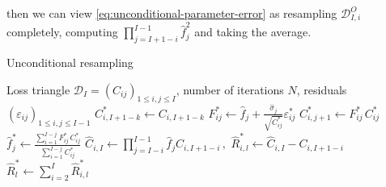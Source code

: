 \documentclass[a4paper]{book}
\theoremstyle{plain}
\begin{document}
then we can view \eqref{eq:unconditional-parameter-error} as resampling $\mathcal{D}^O_{I, i}$ completely, computing $\prod_{j=I+1-i}^{I-1}\hat{f}^2_j$ and taking the average. 

\begin{algorithm}
    \caption{Unconditional resampling} \label{alg:unconditional-resampling}
    \begin{algorithmic}
        \Require Loss triangle $\mathcal{D}_I = (C_{ij})_{1 \leq i, j \leq I}$, number of iterations $N$, residuals $(\varepsilon_{ij})_{1 \leq i, j \leq I - 1}$
        \vspace{2pt}
        \vspace{2pt}
                    \vspace{2pt}
                    \State $C^*_{i, I + 1 - k} \gets C_{i, I + 1 - k}$
                    \vspace{2pt}
                \EndFor
                        \vspace{4pt}
                        \State $\displaystyle F^*_{ij} \gets \hat{f}_j + \frac{\hat{\sigma}_j}{\sqrt{C^*_{ij}}} \varepsilon^*_{ij}$
                        \vspace{4pt}
                        \State $C^*_{i, j + 1} \gets F^*_{ij} \, C^*_{ij}$
                        \vspace{4pt}
                    \EndFor
                    \vspace{4pt}
                        \State $\displaystyle \hat{f}^*_j \gets \frac{\sum_{i = 1}^{I - j}F^*_{ij} \, C^*_{ij}}{\sum_{i = 1}^{I - j} C^*_{ij}}$
                    \vspace{4pt}
                \EndFor
                \vspace{3pt}
                \State $\hat{C}_{i, I} \gets \prod_{j = I - i}^{I - 1} \hat{f}_j C_{i, I + 1 - i} \,,$
                \vspace{2pt}
                \State $\hat{R}^*_{i, l} \gets \hat{C}_{i, I} - C_{i, I + 1 - i}$
                \vspace{3pt}
            \EndFor
            \vspace{2pt}
            \State $\hat{R}^*_l \gets \sum_{i = 2}^I \hat{R}^*_{i, l}$
            \vspace{2pt}
        \EndFor
    \end{algorithmic}
\end{algorithm}
\end{document}
